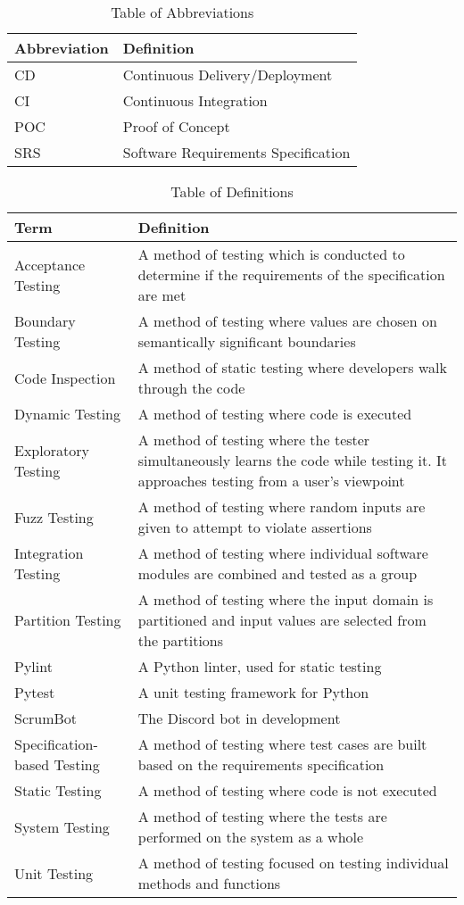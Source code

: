 \documentclass[12pt, titlepage]{article}
\begin{document}
\begin{table}[hbp]
    \caption{Table of Abbreviations}
    \label{Table}
    \begin{tabularx}{\textwidth}{p{3cm}X}
        \toprule
        \textbf{Abbreviation} & \textbf{Definition} \\
        \midrule
        CD & Continuous Delivery/Deployment\\
        CI & Continuous Integration\\
        POC & Proof of Concept\\
        SRS & Software Requirements Specification\\
        \bottomrule
    \end{tabularx}
\end{table}
\newpage
\begin{table}[!htbp]
    \caption{Table of Definitions}
    \label{Table}
    \begin{tabularx}{\textwidth}{p{4cm}X}
        \toprule
        \textbf{Term} & \textbf{Definition}\\
        \midrule
        Acceptance Testing & A method of testing which is conducted to determine if the requirements of the specification are met\\
        Boundary Testing & A method of testing where values are chosen on semantically significant boundaries\\
        Code Inspection & A method of static testing where developers walk through the code\\
        Dynamic Testing & A method of testing where code is executed\\
        Exploratory Testing & A method of testing where the tester simultaneously learns the code while testing it. It approaches testing from a user's viewpoint\\
        Fuzz Testing & A method of testing where random inputs are given to attempt to violate assertions\\
        Integration Testing & A method of testing where individual software modules are combined and tested as a group\\
        Partition Testing & A method of testing where the input domain is partitioned and input values are selected from the partitions\\
        Pylint & A Python linter, used for static testing\\
        Pytest & A unit testing framework for Python\\
        ScrumBot & The Discord bot in development\\
        Specification-based Testing & A method of testing where test cases are built based on the requirements specification\\
        Static Testing & A method of testing where code is not executed\\
        System Testing & A method of testing where the tests are performed on the system as a whole\\
        Unit Testing & A method of testing focused on testing individual methods and functions\\
        \bottomrule
    \end{tabularx}
\end{table} 
\end{document}
